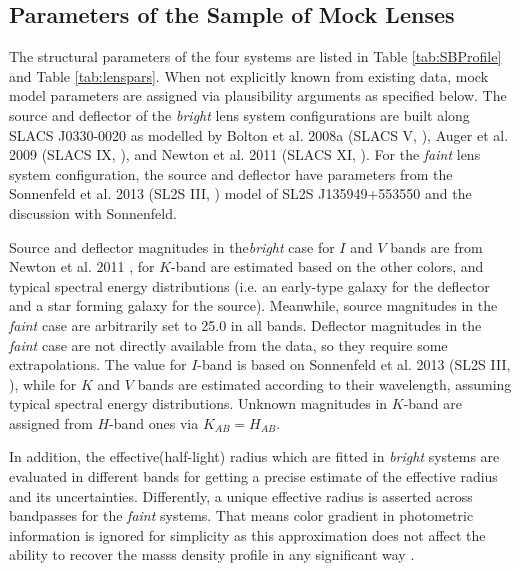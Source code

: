 \documentclass[a4paper,11pt]{article}
\begin{document}
\subsection{Parameters of the Sample of Mock Lenses}
The structural parameters of the four systems are listed in Table
\ref{tab:SBProfile} and Table \ref{tab:lenspars}. When not explicitly known from existing data,
mock model parameters are assigned via plausibility arguments as
specified below. The source and deflector of the \textit{bright} lens
system configurations are built along SLACS J0330-0020 as modelled by
Bolton et al. 2008a (SLACS V, \cite{2008ApJ...682..964B}), Auger et
al. 2009 (SLACS IX, \cite{2009ApJ...705.1099A}), and Newton et
al. 2011 (SLACS XI, \cite{2011ApJ...734..104N}). For the
\textit{faint} lens system configuration, the source and deflector
have parameters from the Sonnenfeld et al. 2013 (SL2S III,
\cite{2013ApJ...777...97S}) model of SL2S J135949+553550 and the
discussion with Sonnenfeld. 

Source and deflector magnitudes in the\textit{bright} case for $I$ and $V$ bands are from Newton et al. 2011 \cite{2011ApJ...734..104N}, for $K$-band are estimated based on the
other colors, and typical spectral energy distributions (i.e. an
early-type galaxy for the deflector and a star forming galaxy for the
source). Meanwhile, source magnitudes in the \textit{faint} case are
arbitrarily set to 25.0 in all bands. Deflector magnitudes in the \textit{faint} case are not directly
available from the data, so they require some extrapolations. The
value for $I$-band is based on Sonnenfeld et al. 2013 (SL2S III,
\cite{2013ApJ...777...97S}), while for $K$ and $V$ bands are estimated
according to their wavelength, assuming typical spectral energy
distributions. Unknown magnitudes in $K$-band are assigned from
$H$-band ones via $K_{AB}=H_{AB}$.

In addition, the effective(half-light) radius which are fitted in \textit{bright} systems are
evaluated in different bands for getting a precise estimate of the
effective radius and its uncertainties. Differently, a unique
effective radius is asserted across bandpasses for the \textit{faint}
systems. That means color gradient in photometric information is
ignored for simplicity as this approximation does not affect the
ability to recover the masss density profile in any significant way
\cite{2013ApJ...777...97S}.

\end{document}
